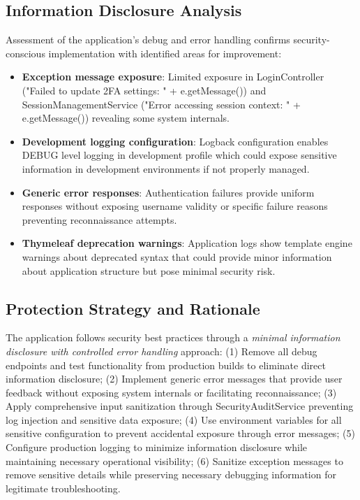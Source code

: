 \documentclass[]{UCD_CS_FYP_Report}
\begin{document}
\subsection{Information Disclosure Analysis}
Assessment of the application's debug and error handling confirms security-conscious implementation with identified areas for improvement:
\begin{itemize}
	\item \textbf{Exception message exposure}: Limited exposure in LoginController ("Failed to update 2FA settings: " + e.getMessage()) and SessionManagementService ("Error accessing session context: " + e.getMessage()) revealing some system internals.
	\item \textbf{Development logging configuration}: Logback configuration enables DEBUG level logging in development profile which could expose sensitive information in development environments if not properly managed.
	\item \textbf{Generic error responses}: Authentication failures provide uniform responses without exposing username validity or specific failure reasons preventing reconnaissance attempts.
	\item \textbf{Thymeleaf deprecation warnings}: Application logs show template engine warnings about deprecated syntax that could provide minor information about application structure but pose minimal security risk.
\end{itemize}

\subsection{Protection Strategy and Rationale}
The application follows security best practices through a \textit{minimal information disclosure with controlled error handling} approach: (1) Remove all debug endpoints and test functionality from production builds to eliminate direct information disclosure; (2) Implement generic error messages that provide user feedback without exposing system internals or facilitating reconnaissance; (3) Apply comprehensive input sanitization through SecurityAuditService preventing log injection and sensitive data exposure; (4) Use environment variables for all sensitive configuration to prevent accidental exposure through error messages; (5) Configure production logging to minimize information disclosure while maintaining necessary operational visibility; (6) Sanitize exception messages to remove sensitive details while preserving necessary debugging information for legitimate troubleshooting.
\end{document}
